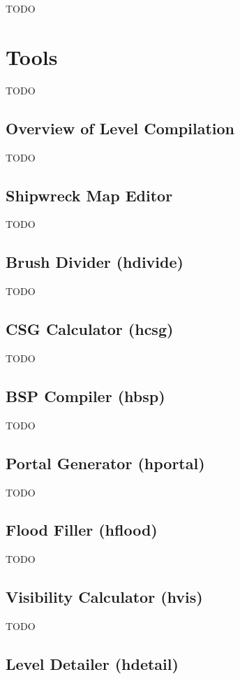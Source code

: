 TODO

\section{Tools}

TODO

\subsection{Overview of Level Compilation}

TODO

\subsection{Shipwreck Map Editor}

TODO

\subsection{Brush Divider (hdivide)}

TODO

\subsection{CSG Calculator (hcsg)}

TODO

\subsection{BSP Compiler (hbsp)}

TODO

\subsection{Portal Generator (hportal)}

TODO

\subsection{Flood Filler (hflood)}

TODO

\subsection{Visibility Calculator (hvis)}

TODO

\subsection{Level Detailer (hdetail)}

